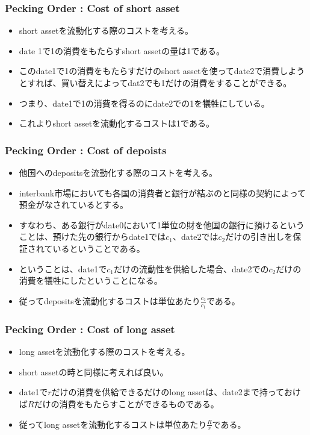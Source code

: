 \documentclass[dvipdfmx, 12pt]{beamer}
\begin{document}
\begin{frame}\frametitle{Pecking Order : Cost of short asset}
	\begin{itemize}
	\item short assetを流動化する際のコストを考える。
	\item date 1で1の消費をもたらすshort assetの量は1である。
	\item このdate1で1の消費をもたらすだけのshort assetを使ってdate2で消費しようとすれば、買い替えによってdat2でも1だけの消費をすることができる。
	\item つまり、date1で1の消費を得るのにdate2での1を犠牲にしている。
	\item これよりshort assetを流動化するコストは1である。
	\end{itemize}
\end{frame}

\begin{frame}\frametitle{Pecking Order : Cost of depoists}
	\begin{itemize}
	\item 他国へのdepositsを流動化する際のコストを考える。
	\item interbank市場においても各国の消費者と銀行が結ぶのと同様の契約によって預金がなされているとする。
	\item すなわち、ある銀行がdate0において1単位の財を他国の銀行に預けるということは、預けた先の銀行からdate1では$c_1$、date2では$c_2$だけの引き出しを保証されているということである。
	\item ということは、date1で$c_1$だけの流動性を供給した場合、date2での$c_2$だけの消費を犠牲にしたということになる。
	\item 従ってdepositsを流動化するコストは単位あたり$\frac{c_2}{c_1}$である。
	\end{itemize}
\end{frame}

\begin{frame}\frametitle{Pecking Order : Cost of long asset}
	\begin{itemize}
	\item long assetを流動化する際のコストを考える。
	\item short assetの時と同様に考えれば良い。
	\item date1で$r$だけの消費を供給できるだけのlong assetは、date2まで持っておけば$R$だけの消費をもたらすことができるものである。
	\item 従ってlong assetを流動化するコストは単位あたり$\frac{R}{r}$である。
	\end{itemize}
\end{frame}
\end{document}
